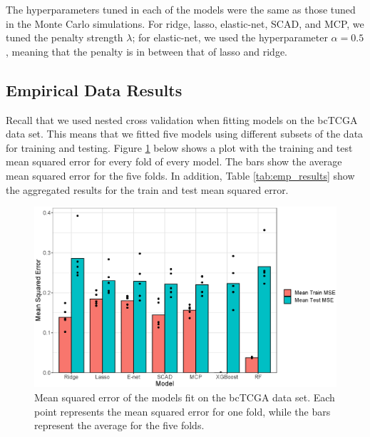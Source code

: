 \documentclass[final,onefignum,onetabnum]{siuro210301}
\begin{document}
	The hyperparameters tuned in each of the models were the same as those tuned in the Monte Carlo simulations. For ridge, lasso, elastic-net, SCAD, and MCP, we tuned the penalty strength $\lambda$; for elastic-net, we used the hyperparameter $\alpha = 0.5$, meaning that the penalty is in between that of lasso and ridge. 
	
	\subsection{Empirical Data Results}
	Recall that we used nested cross validation when fitting models on the bcTCGA data set. This means that we fitted five models using different subsets of the data for training and testing. Figure \ref{fig:empirical_mse} below shows a plot with the training and test mean squared error for every fold of every model. The bars show the average mean squared error for the five folds. In addition, Table \ref{tab:emp_results} show the aggregated results for the train and test mean squared error.
	
	\begin{figure}[h!]
		\centering
		\includegraphics[width = 0.8\linewidth]{images/empirical_mse.eps}
		\captionsetup{width = 0.8\textwidth}
		\caption{Mean squared error of the models fit on the bcTCGA data set. Each point represents the mean squared error for one fold, while the bars represent the average for the five folds.}
		\label{fig:empirical_mse}
	\end{figure}
	
\end{document}
